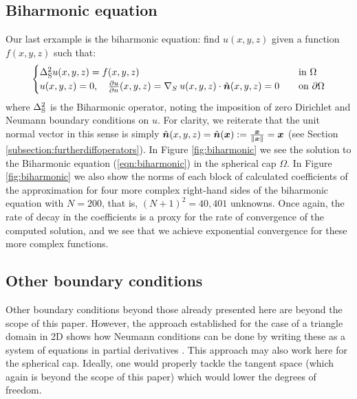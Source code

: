 \documentclass[11pt, oneside]{article}   	%
\begin{document}
\subsection{Biharmonic equation}

Our last erxample is the biharmonic equation: find $u(x,y,z)$ given a function $f(x,y,z)$ such that:
\begin{align}
	\begin{cases}
    		\Delta_{\rm S}^2 u(x,y,z) = f(x,y,z) &\quad \text{in } \Omega \\
		u(x,y,z) = 0, \quad \frac{\partial u}{\partial n}(x,y,z) = \nabla_S \: u(x,y,z) \cdot \hat{\bm{n}}(x,y,z) = 0 &\quad \text{on } \partial \Omega
	\end{cases}
	\label{eqn:biharmonic}
\end{align}
where $\Delta_{\rm S}^2$ is the Biharmonic operator, noting the imposition of zero Dirichlet and Neumann boundary conditions on $u$. For clarity, we reiterate that the unit normal vector in this sense is simply $\hat{\bm{n}}(x,y,z) = \hat{\bm{n}}(\bm{x}) := {\bm{x} \over \left\| \bm{x} \right\|} = \bm{x}$ (see Section \ref{subsection:furtherdiffoperators}). In Figure \ref{fig:biharmonic} we see the solution to the Biharmonic equation (\ref{eqn:biharmonic}) in the spherical cap $\Omega$. In Figure \ref{fig:biharmonic} we also show the norms of each block of calculated coefficients of the approximation for four more complex right-hand sides of the biharmonic equation with $N = 200$, that is, $(N+1)^2 = 40,401$ unknowns. Once again, the rate of decay in the coefficients is a proxy for the rate of convergence of the computed solution, and we see that we achieve exponential convergence for these more complex functions.


\subsection{Other boundary conditions}

Other boundary conditions beyond those already presented here are beyond the scope of this paper. However, the approach established for the case of a triangle domain in 2D shows how Neumann conditions can be done by writing these as a system of equations in partial derivatives \cite{olver2019triangle}. This approach may also work here for the spherical cap. Ideally, one would properly tackle the tangent space (which again is beyond the scope of this paper) which would lower the degrees of freedom.



%
\end{document}
